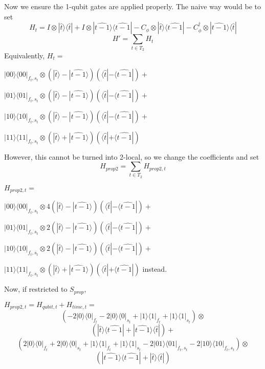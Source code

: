 \documentclass{article}
\theoremstyle{definition}
\begin{document}
Now we ensure the 1-qubit gates are applied properly. The naive way would be to set
	$$H_t=I\otimes|\widehat t\rangle\langle\widehat t|
		+I\otimes|\widehat{t-1}\rangle\langle\widehat{t-1}|
		-C_\phi\otimes|\widehat t\rangle\langle\widehat{t-1}|
		-C_\phi^\dagger\otimes|\widehat{t-1}\rangle\langle\widehat{t}|$$
	$$H'=\sum_{t\in T_2}H_t$$
	Equivalently, $H_t=$

	$|00\rangle\langle00|_{f_t,s_t}\otimes
		(|\widehat{t}\rangle-|\widehat{t-1}\rangle)
		(\langle\widehat{t}|-\langle\widehat{t-1}|)+$

	$|01\rangle\langle01|_{f_t,s_t}\otimes
		(|\widehat{t}\rangle-|\widehat{t-1}\rangle)
		(\langle\widehat{t}|-\langle\widehat{t-1}|)+$

	$|10\rangle\langle10|_{f_t,s_t}\otimes
		(|\widehat{t}\rangle-|\widehat{t-1}\rangle)
		(\langle\widehat{t}|-\langle\widehat{t-1}|)+$

	$|11\rangle\langle11|_{f_t,s_t}\otimes
		(|\widehat{t}\rangle+|\widehat{t-1}\rangle)
		(\langle\widehat{t}|+\langle\widehat{t-1}|)$

However, this cannot be turned into 2-local, so we change the coefficients and set 
	$$H_{prop2}=\sum_{t\in T_2}H_{prop2,t}$$

	$H_{prop2,t}=$

	$|00\rangle\langle00|_{f_t,s_t}\otimes
		4(|\widehat{t}\rangle-|\widehat{t-1}\rangle)
		(\langle\widehat{t}|-\langle\widehat{t-1}|)+$

	$|01\rangle\langle01|_{f_t,s_t}\otimes
		2(|\widehat{t}\rangle-|\widehat{t-1}\rangle)
		(\langle\widehat{t}|-\langle\widehat{t-1}|)+$

	$|10\rangle\langle10|_{f_t,s_t}\otimes
		2(|\widehat{t}\rangle-|\widehat{t-1}\rangle)
		(\langle\widehat{t}|-\langle\widehat{t-1}|)+$

	$|11\rangle\langle11|_{f_t,s_t}\otimes
		(|\widehat{t}\rangle+|\widehat{t-1}\rangle)
		(\langle\widehat{t}|+\langle\widehat{t-1}|)$
instead.

Now, if restricted to $S_{prop}$,

	$H_{prop2,t}=H_{qubit,t}+H_{time,t}=$
	$$(-2|0\rangle\langle0|_{f_t}-2|0\rangle\langle0|_{s_t}
		+|1\rangle\langle1|_{f_t}+|1\rangle\langle1|_{s_t})\otimes$$
	$$(|\widehat{t}\rangle\langle\widehat{t-1}|+
		|\widehat{t-1}\rangle\langle\widehat{t}|)+$$
	$$(2|0\rangle\langle0|_{f_t}+2|0\rangle\langle0|_{s_t}
		+|1\rangle\langle1|_{f_t}+|1\rangle\langle1|_{s_t}
		-2|01\rangle\langle01|_{f_t,s_t}
		-2|10\rangle\langle10|_{f_t,s_t})\otimes$$
	$$(|\widehat{t-1}\rangle\langle\widehat{t-1}|+
		|\widehat{t}\rangle\langle\widehat{t}|)$$
\end{document}
